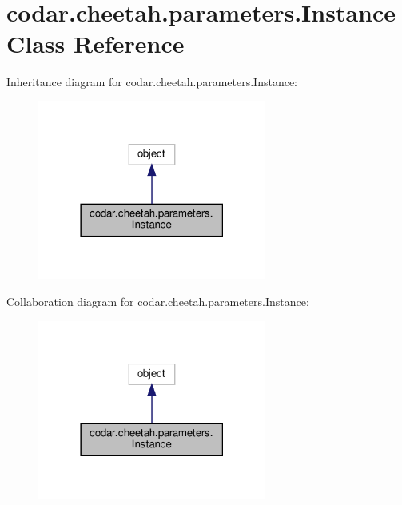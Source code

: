 \hypertarget{classcodar_1_1cheetah_1_1parameters_1_1_instance}{}\section{codar.\+cheetah.\+parameters.\+Instance Class Reference}
\label{classcodar_1_1cheetah_1_1parameters_1_1_instance}


Inheritance diagram for codar.\+cheetah.\+parameters.\+Instance\+:
\nopagebreak
\begin{figure}[H]
\begin{center}
\leavevmode
\includegraphics[width=213pt]{classcodar_1_1cheetah_1_1parameters_1_1_instance__inherit__graph}
\end{center}
\end{figure}


Collaboration diagram for codar.\+cheetah.\+parameters.\+Instance\+:
\nopagebreak
\begin{figure}[H]
\begin{center}
\leavevmode
\includegraphics[width=213pt]{classcodar_1_1cheetah_1_1parameters_1_1_instance__coll__graph}
\end{center}
\end{figure}
